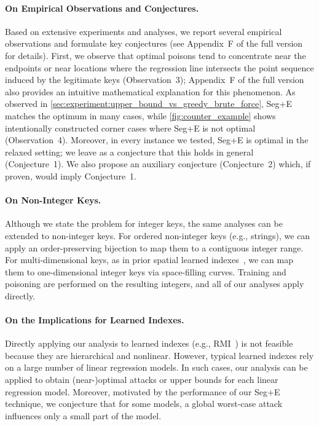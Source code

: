 \documentclass[acmsmall]{acmart}
\begin{document}
\paragraph{On Empirical Observations and Conjectures.}
Based on extensive experiments and analyses, we report several empirical observations and formulate key conjectures (see Appendix~F of the full version~\cite{sato2026mathematical_arxiv} for details).
First, we observe that optimal poisons tend to concentrate near the endpoints or near locations where the regression line intersects the point sequence induced by the legitimate keys (Observation~3);
Appendix~F of the full version~\cite{sato2026mathematical_arxiv} also provides an intuitive mathematical explanation for this phenomenon.
As observed in \cref{sec:experiment:upper_bound_vs_greedy_brute_force}, Seg+E matches the optimum in many cases, while \cref{fig:counter_example} shows intentionally constructed corner cases where Seg+E is not optimal (Observation~4).
Moreover, in every instance we tested, Seg+E is optimal in the relaxed setting; we leave as a conjecture that this holds in general (Conjecture~1).
We also propose an auxiliary conjecture (Conjecture~2) which, if proven, would imply Conjecture~1.

\paragraph{On Non-Integer Keys.}
Although we state the problem for integer keys, the same analyses can be extended to non-integer keys.
For ordered non-integer keys (e.g., strings), we can apply an order-preserving bijection to map them to a contiguous integer range.
For multi-dimensional keys, as in prior spatial learned indexes~\cite{wang2019learned,wang2020spatial}, we can map them to one-dimensional integer keys via space-filling curves.
Training and poisoning are performed on the resulting integers, and all of our analyses apply directly.

\paragraph{On the Implications for Learned Indexes.}
Directly applying our analysis to learned indexes (e.g., RMI~\cite{kraska2018case_li}) is not feasible because they are hierarchical and nonlinear.
However, typical learned indexes rely on a large number of linear regression models.
In such cases, our analysis can be applied to obtain (near-)optimal attacks or upper bounds for each linear regression model.
Moreover, motivated by the performance of our Seg+E technique, we conjecture that for some models, a global worst-case attack influences only a small part of the model.
\end{document}
